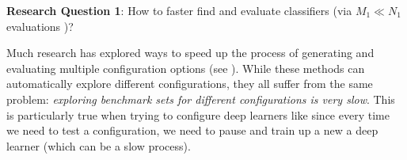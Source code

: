 \begin{blockquote}
\noindent
\textbf{Research Question 1}: 
How to faster find and evaluate classifiers (via $M_1\ll N_1$ evaluations )?
\end{blockquote}

Much research has explored ways to speed up the process of generating and evaluating multiple configuration options (see ).  
While these methods can automatically explore different configurations, they all suffer from the same problem: 
{\em exploring benchmark sets for different configurations is very slow}. This is particularly true when trying to configure deep learners like  since every time we need to test a configuration, we need to pause and train up a new a deep learner (which can be a slow process).

